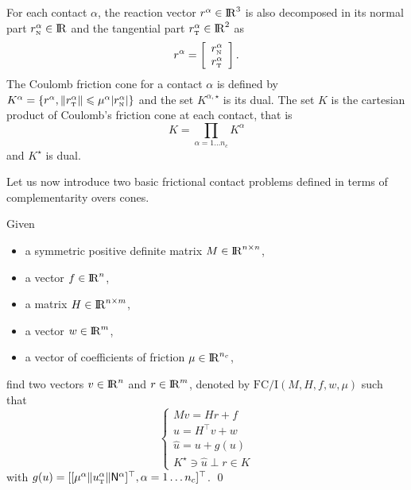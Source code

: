 
For each contact $\alpha$, the reaction vector $r^\alpha\in \mathrm{I\!R}^3$ is also decomposed in its normal part $r_{\hbox{\tiny{N}}}^{\alpha}\in \mathrm{I\!R}$ and the tangential part $r_{\hbox{\tiny{T}}}^\alpha\in\mathrm{I\!R}^2$ as
\begin{equation}
  \label{eq:contactreaction}
  r^\alpha = \left[
  \begin{array}{c}
    r^\alpha_{\n} \\
    r^\alpha_{\t}   
  \end{array}\right].
\end{equation}
The Coulomb friction cone for a  contact $\alpha$ is defined by $K^{\alpha}  = \{r^\alpha, \|r^\alpha_{\hbox{\tiny{T}}} \| \leqslant \mu^\alpha |r^\alpha_{\hbox{\tiny{N}}}| \}$ and the set $K^{\alpha,\star}$ is its dual. 
The set $K$ is the cartesian product of Coulomb's friction cone at each contact, that is
\begin{equation}
  \label{eq:CC_bis}
  K = \prod_{\alpha=1\ldots n_c} K^{\alpha} 
\end{equation}
and $K^\star$ is dual.

Let us now introduce two basic frictional contact problems defined in terms of complementarity overs cones.
\begin{problem}\label{prob:I}
  Given
  \begin{itemize}
    \item a symmetric positive definite matrix ${M} \in \mathrm{I\!R}^{n \times n}$,
    \item a vector $ {f} \in \mathrm{I\!R}^n$,
    \item a matrix  ${H} \in \mathrm{I\!R}^{n \times m}$,
    \item a vector $w \in \mathrm{I\!R}^{m}$,
    \item a vector of coefficients of friction $\mu \in \mathrm{I\!R}^{n_c}$,
  \end{itemize}
find two vectors $ {v} \in \mathrm{I\!R}^n$ and $r\in \mathrm{I\!R}^m$, denoted by $\mathrm{FC/I}(M,H,f,w,\mu)$  such that
\begin{equation}\label{eq:soccp1}
  \begin{cases}
    M v = {H} {r} + {f} \\[2mm]
    u = H^\top v + w \\[2mm]
    \hat u = u + g(u) \\[2mm]
    K^\star \ni {\hat u} \perp r \in K
  \end{cases}
\end{equation}
with $g(u) = [[\mu^\alpha  \|u^\alpha_{\hbox{\tiny{T}}}\| {\sf N}^\alpha]^\top, \alpha = 1\ldots n_c]^\top$. 
\qed
\end{problem}

